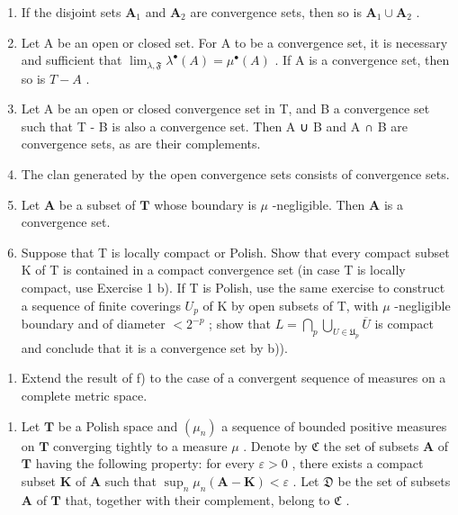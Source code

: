 \begin{enumerate}
\def\labelenumi{\alph{enumi})}
\item
  If the disjoint sets \(\mathbf{A}_1\) and \(\mathbf{A}_2\) are convergence sets, then so is \(\mathbf{A}_1 \cup \mathbf{A}_2\) .
\item
  Let A be an open or closed set. For A to be a convergence set, it is necessary and sufficient that \(\lim_{\lambda,\mathfrak{F}} \lambda^{\bullet}(A) = \mu^{\bullet}(A)\) . If A is a convergence set, then so is \(T - A\) .
\item
  Let A be an open or closed convergence set in T, and B a convergence set such that T - B is also a convergence set. Then A ∪ B and A ∩ B are convergence sets, as are their complements.
\item
  The clan generated by the open convergence sets consists of convergence sets.
\item
  Let \(\mathbf{A}\) be a subset of \(\mathbf{T}\) whose boundary is \(\mu\) -negligible. Then \(\mathbf{A}\) is a convergence set.
\item
  Suppose that T is locally compact or Polish. Show that every compact subset K of T is contained in a compact convergence set (in case T is locally compact, use Exercise 1 b). If T is Polish, use the same exercise to construct a sequence of finite coverings \(U_{p}\) of K by open subsets of T, with \(\mu\) -negligible boundary and of diameter \(<2^{-p}\) ; show that \(L=\bigcap_{p}\bigcup_{U\in\mathfrak{U}_{p}}\overline{U}\) is compact and conclude that it is a convergence set by b)).
\end{enumerate}


\begin{enumerate}
\def\labelenumi{\alph{enumi})}
\setcounter{enumi}{6}
\tightlist
\item
  Extend the result of f) to the case of a convergent sequence of measures on a complete metric space.
\end{enumerate}

\begin{enumerate}
\def\labelenumi{\arabic{enumi})}
\setcounter{enumi}{2}
\tightlist
\item
  Let \(\mathbf{T}\) be a Polish space and \((\mu_n)\) a sequence of bounded positive measures on \(\mathbf{T}\) converging tightly to a measure \(\mu\) . Denote by \(\mathfrak{C}\) the set of subsets \(\mathbf{A}\) of \(\mathbf{T}\) having the following property: for every \(\varepsilon > 0\) , there exists a compact subset \(\mathbf{K}\) of \(\mathbf{A}\) such that \(\sup_{n} \mu_n(\mathbf{A} - \mathbf{K}) < \varepsilon\) . Let \(\mathfrak{D}\) be the set of subsets \(\mathbf{A}\) of \(\mathbf{T}\) that, together with their complement, belong to \(\mathfrak{C}\) .
\end{enumerate}

